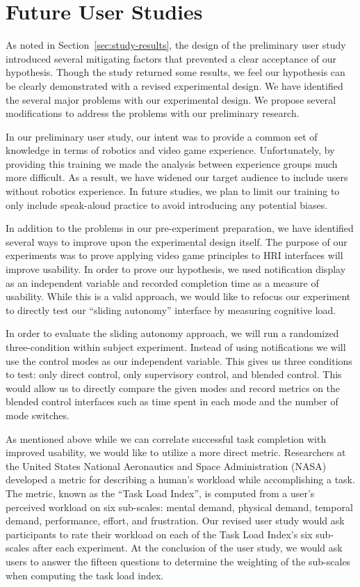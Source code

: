 

\section{Future User Studies}
\label{sec:futurestudy}
As noted in Section~\ref{sec:study-results}, the design of the preliminary user study introduced several mitigating factors that prevented a clear acceptance of our hypothesis. Though the study returned some results, we feel our hypothesis can be clearly demonstrated with a revised experimental design. We have identified the several major problems with our experimental design. We propose several modifications to address the problems with our preliminary research.

In our preliminary user study, our intent was to provide a common set of knowledge in terms of robotics and video game experience. Unfortunately, by providing this training we made the analysis between experience groups much more difficult. As a result, we have widened our target audience to include users without robotics experience. In future studies, we plan to limit our training to only include speak-aloud practice to avoid introducing any potential biases.

In addition to the problems in our pre-experiment preparation, we have identified several ways to improve upon the experimental design itself. The purpose of our experiments was to prove applying video game principles to HRI interfaces will improve usability. In order to prove our hypothesis, we used notification display as an independent variable and recorded completion time as a measure of usability. While this is a valid approach, we would like to refocus our experiment to directly test our ``sliding autonomy'' interface by measuring cognitive load. 

In order to evaluate the sliding autonomy approach, we will run a randomized three-condition within subject experiment. Instead of using notifications we will use the control modes as our independent variable. This gives us three conditions to test: only direct control, only supervisory control, and blended control. This would allow us to directly compare the given modes and record metrics on the blended control interfaces such as time spent in each mode and the number of mode switches.

As mentioned above while we can correlate successful task completion with improved usability, we would like to utilize a more direct metric. Researchers at the United States National Aeronautics and Space Administration (NASA) developed a metric for describing a human's workload while accomplishing a task. The metric, known as the ``Task Load Index'', is computed from a user's perceived workload on six sub-scales: mental demand, physical demand, temporal demand, performance, effort, and frustration. \cite{NASA_TLX} Our revised user study would ask participants to rate their workload on each of the Task Load Index's six sub-scales after each experiment. At the conclusion of the user study, we would ask users to answer the fifteen questions to determine the weighting of the sub-scales when computing the task load index. \cite{NASA_TLX20}

